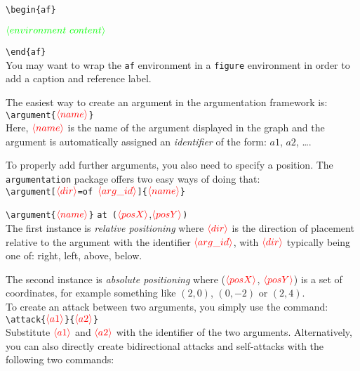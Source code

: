 \documentclass[headings=normal]{scrartcl}
\newcommand{\argumentation}{\texttt{argumentation}\xspace}
\newcommand{\opt}[2][red]{\ensuremath{\textcolor{#1}{\langle #2\rangle}}}
\begin{document}
\vspace{-0.3cm}
\verb|\begin{af}|

\quad\opt[green]{environment~content}

\verb|\end{af}|\\

\noindent
You may want to wrap the \texttt{af} environment in a \texttt{figure} environment in order to add a caption and reference label.

The easiest way to create an argument in the argumentation framework is:\\

\vspace{-0.3cm}
\verb|\argument{|\opt{name}\verb|}|\\

\noindent
Here, \opt{name} is the name of the argument displayed in the graph and the argument is automatically assigned an \emph{identifier} of the form: $a1$, $a2$, \dots.

To properly add further arguments, you also need to specify a position.
The \argumentation package offers two easy ways of doing that:\\

\vspace{-0.3cm}
\verb|\argument[|\opt{dir}\verb|=of |\opt{arg\_id}\verb|]{|\opt{name}\verb|}|

\verb|\argument{|\opt{name}\verb|}| \verb|at (|\opt{posX},\opt{posY}\verb|)|\\

\noindent
The first instance is \emph{relative positioning} where \opt{dir} is the direction of placement relative to the argument with the identifier \opt{arg\_id}, with \opt{dir} typically being one of: \textsf{right}, \textsf{left}, \textsf{above}, \textsf{below}.

The second instance is \emph{absolute positioning} where (\opt{posX}, \opt{posY}) is a set of coordinates, for example something like $(2, 0)$, $(0, -2)$ or $(2, 4)$.\\

\noindent
To create an attack between two arguments, you simply use the command:\\

\vspace{-0.3cm}
\verb|\attack{|\opt{a1}\verb|}{|\opt{a2}\verb|}|\\

\noindent
Substitute \opt{a1} and \opt{a2} with the identifier of the two arguments.
Alternatively, you can also directly create bidirectional attacks and self-attacks with the following two commands:\\
\end{document}
